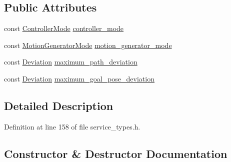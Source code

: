 \subsection*{Public Attributes}
\begin{DoxyCompactItemize}
\item 
const \hyperlink{structresearch__interface_1_1robot_1_1Move_a3e7b80b30bbf01dc902c84402502ebbc}{Controller\+Mode} \hyperlink{structresearch__interface_1_1robot_1_1Move_1_1Request_abdc9f396518796f92f722ba1d6d50861}{controller\+\_\+mode}
\item 
const \hyperlink{structresearch__interface_1_1robot_1_1Move_a334b8380507154e8042b57fbd3287c0f}{Motion\+Generator\+Mode} \hyperlink{structresearch__interface_1_1robot_1_1Move_1_1Request_a550736be5350d0987a133557a8757fd5}{motion\+\_\+generator\+\_\+mode}
\item 
const \hyperlink{structresearch__interface_1_1robot_1_1Move_1_1Deviation}{Deviation} \hyperlink{structresearch__interface_1_1robot_1_1Move_1_1Request_ace5bcd09768e2cba8ba1e4833d61927d}{maximum\+\_\+path\+\_\+deviation}
\item 
const \hyperlink{structresearch__interface_1_1robot_1_1Move_1_1Deviation}{Deviation} \hyperlink{structresearch__interface_1_1robot_1_1Move_1_1Request_af2afe598f4dde96a266c56e3cbfc9bd5}{maximum\+\_\+goal\+\_\+pose\+\_\+deviation}
\end{DoxyCompactItemize}


\subsection{Detailed Description}


Definition at line 158 of file service\+\_\+types.\+h.



\subsection{Constructor \& Destructor Documentation}
\mbox{\label{structresearch__interface_1_1robot_1_1Move_1_1Request_a763f469d46e3c7b3c74e67995d1974f5}} 
